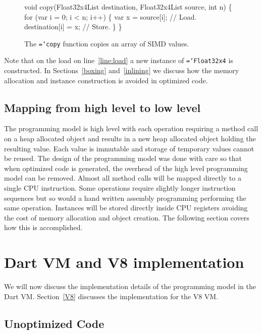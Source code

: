 \documentclass[preprint]{sigplanconf}
\newcommand{\ttt}[1]{{\texttt{\hyphenchar\font=`\-\relax #1}}}%
\begin{document}
\begin{figure}
\begin{small}
\begin{program}[style=tt, number=true]
vo\tab{}id copy(\tab{}Float32x4List destination,
          Float32x4List source,
          int n) \{\untab{}
  fo\tab{}r (var i = 0; i < n; i++) \{
    var x = source[i];   // Load.\label{line:load}
    destination[i] = x;  // Store.\untab{}
  \}\untab{}
\}
\end{program}
\end{small}
\caption{The \ttt{copy} function copies an array of SIMD values.}
\label{fig:load-store}
\end{figure}

Note that on the load on line~\ref{line:load} a new instance of \ttt{Float32x4}
is constructed. In Sections~\ref{boxing} and~\ref{inlining} we discuss how the
memory allocation and instance construction is avoided in optimized code.

\subsection{Mapping from high level to low level}

The programming model is high level with each operation requiring a method call
on a heap allocated object and results in a new heap allocated object holding
the resulting value. Each value is immutable and storage of temporary values
cannot be reused. The design of the programming model was done with care so that
when optimized code is generated, the overhead of the high level programming
model can be removed. Almost all method calls will be mapped directly to a
single CPU instruction. Some operations require slightly longer instruction
sequences but so would a hand written assembly programming performing the same
operation. Instances will be stored directly inside CPU registers avoiding the
cost of memory allocation and object creation. The following section covers how
this is accomplished.

\section{Dart VM and V8 implementation}

We will now discuss the implementation details of the programming model in the
Dart VM. Section~\ref{V8} discusses the implementation for the V8 VM.

\subsection{Unoptimized Code}
\end{document}
